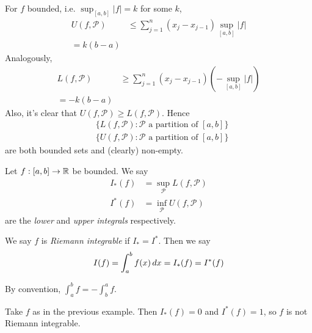 \documentclass{../template/note}
\begin{document}
    \begin{remark*}
        For \(f\) bounded, i.e. \(\sup_{[a, b]} |f| = k\) for some \(k\),
        \begin{align*}
            U(f, \mathcal P) &\leq \sum_{j=1}^n (x_j-x_{j-1})\sup_{[a,b]}|f| \\
            = k(b-a)
        \end{align*}
        Analogously,
        \begin{align*}
            L(f, \mathcal P) &\geq \sum_{j=1}^n (x_j-x_{j-1})(-\sup_{[a,b]}|f|) \\
            = -k(b-a)
        \end{align*}
        Also, it's clear that \(U(f, \mathcal P) \geq L(f, \mathcal P)\). Hence
        \begin{align*}
            &\{L(f, \mathcal P): \mathcal P \text{ a partition of }[a,b]\} \\
            &\{U(f, \mathcal P): \mathcal P \text{ a partition of }[a,b]\}
        \end{align*}
        are both bounded sets and (clearly) non-empty.        
    \end{remark*}
    
    \begin{definition}
        Let \(f: [a, b] \to \mathbb R\) be bounded. We say
        \begin{align*}
            I_*(f) &= \sup_{\mathcal P} L(f, \mathcal P) \\
            I^*(f) &= \inf_{\mathcal P} U(f, \mathcal P)
        \end{align*}
        are the \emph{lower} and \emph{upper integrals} respectively.        
    \end{definition}
    
    \begin{definition}
        We say \(f\) is \emph{Riemann integrable} if \(I_* = I^*\). Then we say
        \begin{align*}
            I(f) = \int_a^b f(x) \,d{x} = I_*(f) = I^*(f)
        \end{align*}
    \end{definition}
    
    \begin{remark*}
        By convention, \(\int_a^b f = -\int_b^a f\).
    \end{remark*}
    
    \begin{example*}
        Take \(f\) as in the previous example. Then \(I_*(f) = 0\) and \(I^*(f) = 1\), so \(f\) is not Riemann integrable.
    \end{example*}
    
\end{document}
